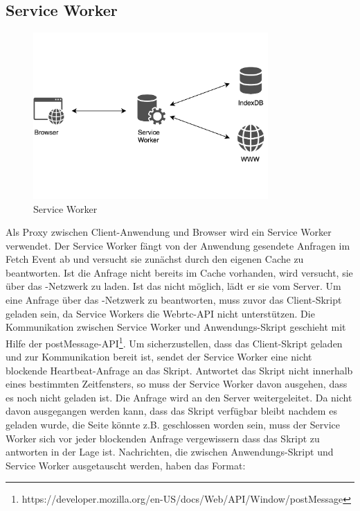 \subsection{Service Worker}

\begin{figure}[!h]
	\centering
	\includegraphics[width=0.8\textwidth]{figures/ServiceWorker}
	\caption[Service Worker]{Service Worker}
	\label{fig:serviceWorker}
\end{figure}

Als Proxy zwischen Client-Anwendung und Browser wird ein Service Worker verwendet. Der Service Worker fängt von der Anwendung gesendete Anfragen im Fetch Event ab und versucht sie zunächst durch den eigenen Cache zu beantworten. Ist die Anfrage nicht bereits im Cache vorhanden, wird versucht, sie über das \pTp-Netzwerk zu laden. Ist das nicht möglich, lädt er sie vom Server. 
Um eine Anfrage über das \pTp-Netzwerk zu beantworten, muss zuvor das Client-Skript geladen sein, da Service Workers die Webrtc-API nicht unterstützen. Die Kommunikation zwischen Service Worker und Anwendungs-Skript geschieht mit Hilfe der postMessage-API\footnote{https://developer.mozilla.org/en-US/docs/Web/API/Window/postMessage}. Um sicherzustellen, dass das Client-Skript geladen und zur Kommunikation bereit ist, sendet der Service Worker eine nicht blockende Heartbeat-Anfrage an das Skript. Antwortet das Skript nicht innerhalb eines bestimmten Zeitfensters, so muss der Service Worker davon ausgehen, dass es noch nicht geladen ist. Die Anfrage wird an den Server weitergeleitet. Da nicht davon ausgegangen werden kann, dass das Skript verfügbar bleibt nachdem es geladen wurde, die Seite könnte z.B. geschlossen worden sein, muss der Service Worker sich vor jeder blockenden Anfrage vergewissern dass das Skript zu antworten in der Lage ist. Nachrichten, die zwischen Anwendungs-Skript und Service Worker ausgetauscht werden, haben das Format: 

